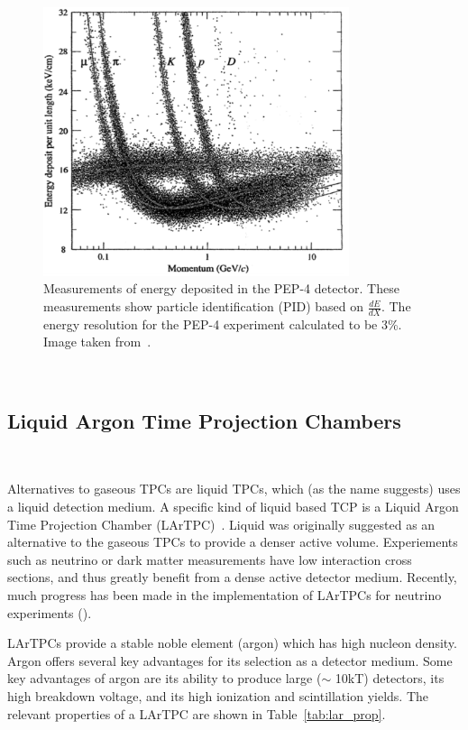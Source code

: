 \begin{figure}[]
\centering
\includegraphics[width=0.8\textwidth]{images/pep4_tpc_dEdx.png}
\caption{Measurements of energy deposited in the PEP-4 detector.
These measurements show particle identification (PID) based on $\frac{dE}{dX}$.
The energy resolution for the PEP-4 experiment calculated to be 3\%.
Image taken from~\citep{pep_image}.
}
\end{figure}
~\label{fig:pep4_tpc_dedex}

\subsection{Liquid Argon Time Projection Chambers}~\label{sec:lartpcs}

Alternatives to gaseous TPCs are liquid TPCs, which (as the name suggests) uses a liquid detection medium.
A specific kind of liquid based TCP is a Liquid Argon Time Projection Chamber (LArTPC)~\citep{rubbia1977liquid}.
Liquid was originally suggested as an alternative to the gaseous TPCs to provide a denser active volume.
Experiements such as neutrino or dark matter measurements have low interaction cross sections, and thus greatly benefit from a dense active detector medium.
Recently, much progress has been made in the implementation of LArTPCs for neutrino experiments (\citep{ArgoNeuT_PhysRevD.99.012002, MicroBooNE_Acciarri_2017, LArIAT_Acciarri_2020}).

LArTPCs provide a stable noble element (argon) which has high nucleon density.
Argon offers several key advantages for its selection as a detector medium.
Some key advantages of argon are its ability to produce large ($\sim$ 10kT) detectors, its high breakdown voltage, and its high ionization and scintillation yields.
The relevant properties of a LArTPC are shown in Table~\ref{tab:lar_prop}.

